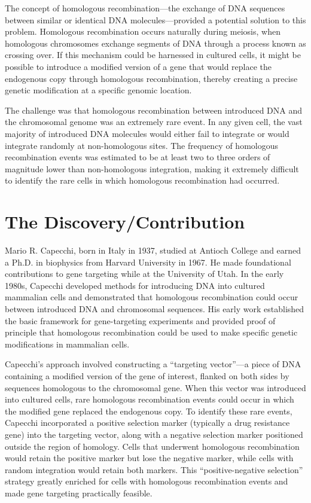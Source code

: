The concept of homologous recombination---the exchange of DNA sequences between similar or identical DNA molecules---provided a potential solution to this problem. Homologous recombination occurs naturally during meiosis, when homologous chromosomes exchange segments of DNA through a process known as crossing over. If this mechanism could be harnessed in cultured cells, it might be possible to introduce a modified version of a gene that would replace the endogenous copy through homologous recombination, thereby creating a precise genetic modification at a specific genomic location.

The challenge was that homologous recombination between introduced DNA and the chromosomal genome was an extremely rare event. In any given cell, the vast majority of introduced DNA molecules would either fail to integrate or would integrate randomly at non-homologous sites. The frequency of homologous recombination events was estimated to be at least two to three orders of magnitude lower than non-homologous integration, making it extremely difficult to identify the rare cells in which homologous recombination had occurred.

\section{The Discovery/Contribution}

Mario R. Capecchi, born in Italy in 1937, studied at Antioch College and earned a Ph.D. in biophysics from Harvard University in 1967. He made foundational contributions to gene targeting while at the University of Utah. In the early 1980s, Capecchi developed methods for introducing DNA into cultured mammalian cells and demonstrated that homologous recombination could occur between introduced DNA and chromosomal sequences. His early work established the basic framework for gene-targeting experiments and provided proof of principle that homologous recombination could be used to make specific genetic modifications in mammalian cells.

Capecchi's approach involved constructing a ``targeting vector''---a piece of DNA containing a modified version of the gene of interest, flanked on both sides by sequences homologous to the chromosomal gene. When this vector was introduced into cultured cells, rare homologous recombination events could occur in which the modified gene replaced the endogenous copy. To identify these rare events, Capecchi incorporated a positive selection marker (typically a drug resistance gene) into the targeting vector, along with a negative selection marker positioned outside the region of homology. Cells that underwent homologous recombination would retain the positive marker but lose the negative marker, while cells with random integration would retain both markers. This ``positive-negative selection'' strategy greatly enriched for cells with homologous recombination events and made gene targeting practically feasible.

